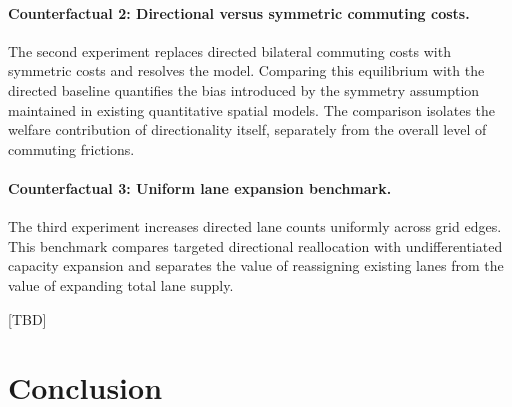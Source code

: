 \documentclass[12pt]{article}
\begin{document}
\paragraph{Counterfactual 2: Directional versus symmetric commuting costs.}
The second experiment replaces directed bilateral commuting costs with symmetric costs and resolves the model. Comparing this equilibrium with the directed baseline quantifies the bias introduced by the symmetry assumption maintained in existing quantitative spatial models. The comparison isolates the welfare contribution of directionality itself, separately from the overall level of commuting frictions.

\paragraph{Counterfactual 3: Uniform lane expansion benchmark.}
The third experiment increases directed lane counts uniformly across grid edges. This benchmark compares targeted directional reallocation with undifferentiated capacity expansion and separates the value of reassigning existing lanes from the value of expanding total lane supply.\\

\par

[TBD]

\section{Conclusion}
\label{sec:conclusion}
\end{document}
